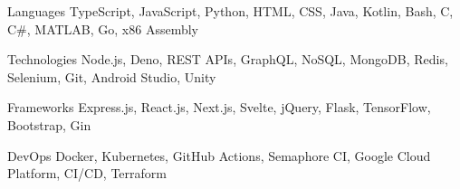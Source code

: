 

\begin{cvskills}

  \cvskill
    {Languages} %
    {TypeScript, JavaScript, Python, HTML, CSS, Java, Kotlin, Bash, C, C\#, MATLAB, Go, x86 Assembly } %

  \cvskill
    {Technologies} %
    {Node.js, Deno, REST APIs, GraphQL, NoSQL, MongoDB, Redis, Selenium, Git, Android Studio, Unity} %

  \cvskill
    {Frameworks} %
    {Express.js, React.js, Next.js, Svelte, jQuery, Flask, TensorFlow, Bootstrap, Gin} %

  \cvskill
    {DevOps} %
    {Docker, Kubernetes, GitHub Actions, Semaphore CI, Google Cloud Platform, CI/CD, Terraform} %

\end{cvskills}
